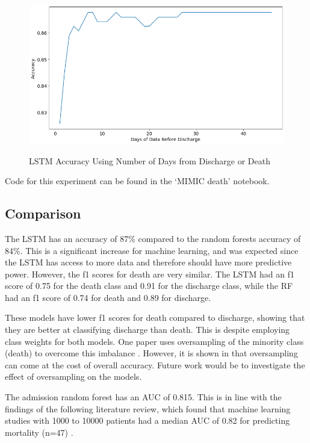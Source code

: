 \documentclass[12pt]{article}
\begin{document}
\begin{figure}[H]
\centering\caption{LSTM Accuracy Using Number of Days from Discharge or Death}
\includegraphics[scale=0.52]{LSTM Accuracy Using Number of Days from Discharge or Death.png}
\label{LSTM Accuracy Using Number of Days from Discharge or Death}
\end{figure}
Code for this experiment can be found in the `MIMIC death' notebook. 

\subsection{Comparison}

The LSTM has an accuracy of 87\% compared to the random forests accuracy of 84\%. This is a significant increase for machine learning, and was expected since the LSTM has access to more data and therefore should have more predictive power. However, the f1 scores for death are very similar. The LSTM had an f1 score of 0.75 for the death class and 0.91 for the discharge class, while the RF had an f1 score of 0.74 for death and 0.89 for discharge.

These models have lower f1 scores for death compared to discharge, showing that they are better at classifying discharge than death. This is despite employing class weights for both models. One paper uses oversampling of the minority class (death) to overcome this imbalance \cite{ICUFancyLSTM}. However, it is shown in \cite{ImbalancedData} that oversampling can come at the cost of overall accuracy. Future work would be to investigate the effect of oversampling on the models. 

The admission random forest has an AUC of 0.815. This is in line with the findings of the following literature review, which found that machine learning studies with 1000 to 10000 patients had a median AUC of 0.82 for predicting mortality (n=47) \cite{MLICUSystematicReview}. 
\end{document}
